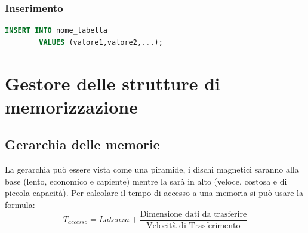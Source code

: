 \documentclass[12pt, a4paper]{report}
\begin{document}
    \subsection{Inserimento}
    \begin{lstlisting}[language=SQL]
        INSERT INTO nome_tabella
        VALUES (valore1,valore2,...);
    \end{lstlisting}
    \chapter{Gestore delle strutture di memorizzazione}
    \section{Gerarchia delle memorie}
    La gerarchia può essere vista come una piramide, i dischi magnetici saranno alla base (lento, economico e capiente) mentre la  sarà in alto (veloce, costosa e di piccola capacità). Per calcolare il tempo di accesso a una memoria si può usare la formula:
    \begin{equation*}
        T_{accesso} = Latenza + \frac{\text{Dimensione dati da trasferire}}{\text{Velocità di Trasferimento}}
    \end{equation*}
\end{document}
